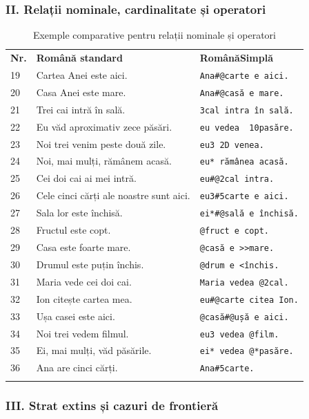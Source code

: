 \documentclass[12pt,onecolumn,letterpaper]{article}
\newcommand{\rs}[1]{\texttt{#1}}
\newcommand{\RSDenseTablelayout}{%
\footnotesize
\setlength{\tabcolsep}{4pt}%
\renewcommand{\arraystretch}{1.03}%
\setlength{\LTleft}{\fill}%
\setlength{\LTright}{\fill}%
\arrayrulecolor{RSRule}%
}
\begin{document}
\subsubsection{II. Relații nominale, cardinalitate și operatori}

\RSDenseTablelayout
\begin{longtable}{@{}p{0.5cm}p{5.45cm}p{5.45cm}@{}}
\rowcolor{RSGray}
\textbf{Nr.} & \textbf{Română standard} & \textbf{RomânăSimplă} \\
19 & Cartea Anei este aici. & \rs{Ana\#@carte e aici.} \\
20 & Casa Anei este mare. & \rs{Ana\#@casă e mare.} \\
21 & Trei cai intră în sală. & \rs{3cal intra în sală.} \\
22 & Eu văd aproximativ zece păsări. & \rs{eu vedea ~10pasăre.} \\
23 & Noi trei venim peste două zile. & \rs{eu3 2D venea.} \\
24 & Noi, mai mulți, rămânem acasă. & \rs{eu* rămânea acasă.} \\
25 & Cei doi cai ai mei intră. & \rs{eu\#@2cal intra.} \\
26 & Cele cinci cărți ale noastre sunt aici. & \rs{eu3\#5carte e aici.} \\
27 & Sala lor este închisă. & \rs{ei*\#@sală e închisă.} \\
28 & Fructul este copt. & \rs{@fruct e copt.} \\
29 & Casa este foarte mare. & \rs{@casă e >>mare.} \\
30 & Drumul este puțin închis. & \rs{@drum e <închis.} \\
31 & Maria vede cei doi cai. & \rs{Maria vedea @2cal.} \\
32 & Ion citește cartea mea. & \rs{eu\#@carte citea Ion.} \\
33 & Ușa casei este aici. & \rs{@casă\#@ușă e aici.} \\
34 & Noi trei vedem filmul. & \rs{eu3 vedea @film.} \\
35 & Ei, mai mulți, văd păsările. & \rs{ei* vedea @*pasăre.} \\
36 & Ana are cinci cărți. & \rs{Ana\#5carte.} \\
\bottomrule
\caption{Exemple comparative pentru relații nominale și operatori}
\end{longtable}

\subsubsection{III. Strat extins și cazuri de frontieră}
\end{document}
